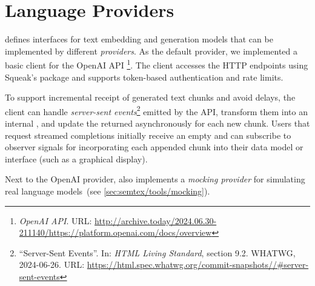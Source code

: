 
\section{Language Providers}
\label{sec:semtex/providers}

\semtex defines interfaces for text embedding and generation models that can be implemented by different \emph{providers}.
As the default provider, we implemented a basic client for the OpenAI API%
\footnote{
	\emph{OpenAI API}.
	URL:
	\url{http://archive.today/2024.06.30-211140/https://platform.openai.com/docs/overview}
}.
The client accesses the HTTP endpoints using Squeak's  package and supports token-based authentication and rate limits.

To support incremental receipt of generated text chunks and avoid delays, the client can handle \emph{server-sent events}\footnote{%
	``Server-Sent Events''.
	In: \emph{HTML Living Standard}, section 9.2.
	WHATWG, 2024-06-26.
	URL:
	\href{https://html.spec.whatwg.org/commit-snapshots/25aaad7f6a10785efe041fb05a597400e700ef10/\#server-sent-events}{https://html.spec.whatwg.org/commit-snapshots//\#server-sent-events}%
} emitted by the API, transform them into an internal , and update the returned  asynchronously for each new chunk.
Users that request streamed completions initially receive an empty  and can subscribe to observer signals for incorporating each appended chunk into their data model or interface (such as a graphical display).

Next to the OpenAI provider, \semtex also implements a \emph{mocking provider} for simulating real language models~(see \cref{sec:semtex/tools/mocking}).
